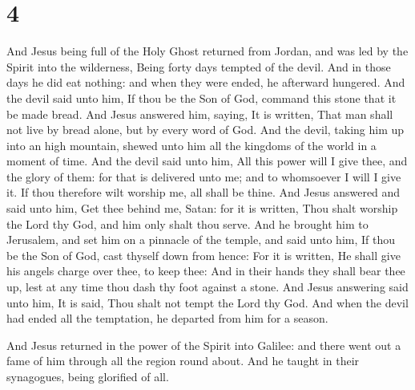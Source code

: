 \hypertarget{section-3}{%
\section{4}\label{section-3}}

 And Jesus being full of the Holy Ghost returned from
Jordan, and was led by the Spirit into the wilderness, 
Being forty days tempted of the devil. And in those days he did eat
nothing: and when they were ended, he afterward hungered. 
And the devil said unto him, If thou be the Son of God, command this
stone that it be made bread.  And Jesus answered him,
saying, It is written, That man shall not live by bread alone, but by
every word of God.  And the devil, taking him up into an
high mountain, shewed unto him all the kingdoms of the world in a moment
of time.  And the devil said unto him, All this power will I
give thee, and the glory of them: for that is delivered unto me; and to
whomsoever I will I give it.  If thou therefore wilt worship
me, all shall be thine.  And Jesus answered and said unto
him, Get thee behind me, Satan: for it is written, Thou shalt worship
the Lord thy God, and him only shalt thou serve.  And he
brought him to Jerusalem, and set him on a pinnacle of the temple, and
said unto him, If thou be the Son of God, cast thyself down from hence:
 For it is written, He shall give his angels charge over
thee, to keep thee:  And in their hands they shall bear
thee up, lest at any time thou dash thy foot against a stone.
 And Jesus answering said unto him, It is said, Thou shalt
not tempt the Lord thy God.  And when the devil had ended
all the temptation, he departed from him for a season.

 And Jesus returned in the power of the Spirit into
Galilee: and there went out a fame of him through all the region round
about.  And he taught in their synagogues, being glorified
of all.

